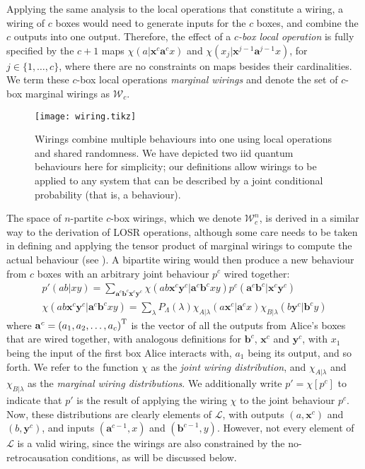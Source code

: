 \documentclass[10pt, a4paper]{article}
\numberwithin{equation}{section} %
\theoremstyle{definition}
\theoremstyle{plain}
\newcommand{\dintv}[2]{\mathopen\{#1,\ldots,#2\mathclose\}}
\newcommand{\?}{\mathrel{?}} %
\newcommand{\cvec}[1]{\boldsymbol{\mathbf{#1}}}    %
\newcommand{\sW}{\mathcal{W}}
\newcommand{\Ls}{\mathcal{L}}
\begin{document}
              Applying the same analysis to the local operations that constitute a wiring, a wiring of \(c\) boxes would need to generate inputs for the \(c\) boxes, and combine the \(c\) outputs into one output. Therefore, the effect of a \emph{\(c\)-box local operation} is fully specified by the \(c+1\) maps \(\chi(a|\cvec{x}^c\cvec{a}^{c}x)\) and \(\chi(x_j|\cvec{x}^{j-1}\cvec{a}^{j-1}x)\), for \(j \in \dintv{1}{c}\), where there are no constraints on maps besides their cardinalities. We term these \(c\)-box local operations \emph{marginal wirings} and denote the set of \(c\)-box marginal wirings as \(\sW_c\).

              \begin{figure}
                \centering
                \texttt{[image: wiring.tikz]}
                \caption[Causal influences in a wiring between two iid quantum behaviours.]{\label{fig:wiring} Wirings combine multiple behaviours into one using local operations and shared randomness. We have depicted two iid quantum behaviours here for simplicity; our definitions allow wirings to be applied to any system that can be described by a joint conditional probability (that is, a behaviour).}
              \end{figure}

              The space of \(n\)-partite \(c\)-box wirings, which we denote \(\sW_c^n\), is derived in a similar way to the derivation of LOSR operations, although some care needs to be taken in defining and applying the tensor product of marginal wirings to compute the actual behaviour (see ). A bipartite wiring would then produce a new behaviour from \(c\) boxes with an arbitrary joint behaviour \(p^c\) wired together:
              \begin{gather}
                p'(ab|xy) = \sum_{\cvec{a}^c\cvec{b}^c\cvec{x}^c\cvec{y}^c} \chi(ab\cvec{x}^c\cvec{y}^c|\cvec{a}^c\cvec{b}^cxy) p^c(\cvec{a}^c\cvec{b}^c|\cvec{x}^c\cvec{y}^c)\label{eqn:jwirdistdef} \\
                \chi(ab\cvec{x}^c\cvec{y}^c|\cvec{a}^c\cvec{b}^cxy) = \sum_{\lambda} P_{\Lambda}(\lambda) \chi_{A|\lambda}(a\cvec{x}^c|\cvec{a}^cx) \chi_{B|\lambda}(b\cvec{y}^c|\cvec{b}^cy) \label{eqn:mwirdistdef}
              \end{gather}
              where \(\cvec{a}^c = {(a_1, a_2, \ldots, a_c)}^{\rm T}\) is the vector of all the outputs from Alice's boxes that are wired together, with analogous definitions for \(\cvec{b}^c\), \(\cvec{x}^c\) and \(\cvec{y}^c\), with \(x_1\) being the input of the first box Alice interacts with, \(a_1\) being its output, and so forth. We refer to the function \(\chi\) as the \emph{joint wiring distribution}, and \(\chi_{A|\lambda}\) and \(\chi_{B|\lambda}\) as the \emph{marginal wiring distributions}. We additionally write \(p' = \chi[p^c]\) to indicate that \(p'\) is the result of applying the wiring \(\chi\) to the joint behaviour \(p^c\). Now, these distributions are clearly elements of \(\Ls\), with outputs \((a, \cvec{x}^c)\) and \((b, \cvec{y}^c)\), and inputs \((\cvec{a}^{c-1}, x)\) and \((\cvec{b}^{c-1}, y)\). However, not every element of \(\Ls\) is a valid wiring, since the wirings are also constrained by the no-retrocausation conditions, as will be discussed below.
\end{document}
